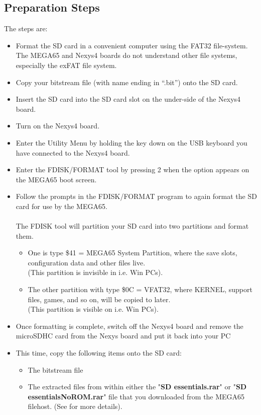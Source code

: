 \subsection{Preparation Steps}

The steps are:

\begin{itemize}
  \item{Format the SD card} in a convenient computer using the FAT32 file-system.  The MEGA65 and Nexys4 boards do not understand other
file systems, especially the exFAT file system.
\item{Copy} your bitstream file (with name ending in ``.bit'') onto the SD card.
\item{Insert} the SD card into the SD card slot on the under-side of the Nexys4 board.
\item{Turn on} the Nexys4 board.
\item{Enter the Utility Menu} by holding the  key down on the USB keyboard you have connected to the Nexys4 board.
\item{Enter the FDISK/FORMAT tool} by pressing 2 when the option appears on the MEGA65 boot screen.
\item{Follow the prompts} in the FDISK/FORMAT program to again format the SD card for use by the MEGA65. \\
  \\
  The FDISK tool will partition your SD card into two partitions and format them.
  \begin{itemize}
    \item One is type \$41 = MEGA65 System Partition, where the save slots, configuration data and other files live. \\
  (This partition is invisible in i.e. Win PCs).
    \item The other partition with type \$0C = VFAT32, where KERNEL, support files, games, and so on, will be copied to later. \\
  (This partition is visible on i.e. Win PCs).
  \end{itemize}
\item{Once formatting is complete}, switch off the Nexys4 board and remove the microSDHC card from the Nexys board and put it back into your PC
\item{This time, copy} the following items onto the SD card:
  \begin{itemize}
    \item The bitstream file
    \item The extracted files from within either the "\textbf{SD essentials.rar}" or "\textbf{SD essentialsNoROM.rar}" file that you downloaded from the MEGA65 filehost. (See  for more details).

\end{itemize}
\end{itemize}
